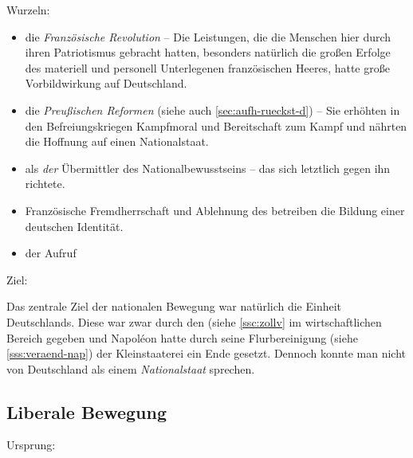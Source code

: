 \noindent Wurzeln:

\begin{itemize}
\item die \emph{Französische Revolution} -- Die Leistungen, die die Menschen hier durch ihren
Patriotismus gebracht hatten, besonders natürlich die großen Erfolge
des materiell und personell Unterlegenen französischen Heeres, hatte
große Vorbildwirkung auf Deutschland.

\item die \emph{Preußischen Reformen} (siehe auch
\ref{sec:aufh-rueckst-d}) -- Sie erhöhten in den Befreiungskriegen
Kampfmoral und Bereitschaft zum Kampf und nährten die Hoffnung auf
einen Nationalstaat.

\item {} als \emph{der} Übermittler
des Nationalbewusstseins -- das sich letztlich gegen ihn richtete.

\item Französische Fremdherrschaft und Ablehnung des
 betreiben die Bildung einer deutschen Identität.

\item der Aufruf  
\end{itemize}


\noindent Ziel:

Das zentrale Ziel der nationalen Bewegung war natürlich die Einheit
Deutschlands. Diese war zwar durch den  (siehe
\ref{ssc:zollv} im wirtschaftlichen Bereich gegeben und Napol\'eon
hatte durch seine Flurbereinigung (siehe \ref{sss:veraend-nap})
der Kleinstaaterei ein Ende gesetzt. Dennoch konnte man nicht von
Deutschland als einem \emph{Nationalstaat} sprechen.



\subsection{Liberale Bewegung}

\noindent Ursprung:

